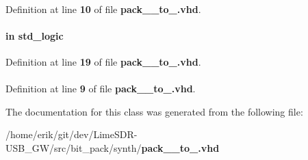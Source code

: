 \paragraph[{numeric\+\_\+std}]{\hspace{0.3cm}{\ttfamily [Package]}}\label{classpack__56__to__64_a2edc34402b573437d5f25fa90ba4013e}


Definition at line {\bf 10} of file {\bf pack\+\_\+\_\+to\+\_.\+vhd}.

\paragraph[{reset\+\_\+n}]{ {\bfseries \textcolor{keywordflow}{in}\textcolor{vhdlchar}{ }} {\bfseries \textcolor{comment}{std\+\_\+logic}\textcolor{vhdlchar}{ }} \hspace{0.3cm}{\ttfamily [Port]}}\label{classpack__56__to__64_a446ea52ed8c4a84181a47d9165ce41a5}


Definition at line {\bf 19} of file {\bf pack\+\_\+\_\+to\+\_.\+vhd}.

\paragraph[{std\+\_\+logic\+\_\+1164}]{\hspace{0.3cm}{\ttfamily [Package]}}\label{classpack__56__to__64_acd03516902501cd1c7296a98e22c6fcb}


Definition at line {\bf 9} of file {\bf pack\+\_\+\_\+to\+\_.\+vhd}.



The documentation for this class was generated from the following file\+:\begin{DoxyCompactItemize}
\item 
/home/erik/git/dev/\+Lime\+S\+D\+R-\/\+U\+S\+B\+\_\+\+G\+W/src/bit\+\_\+pack/synth/{\bf pack\+\_\+\_\+to\+\_.\+vhd}\end{DoxyCompactItemize}

